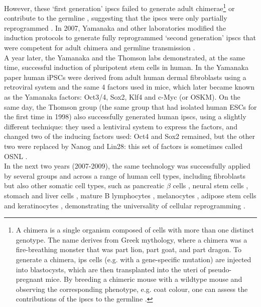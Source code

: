 However, these `first generation' \glspl{ipsc} failed to generate adult chimerae\footnote{A chimera is a single organism composed of cells with more than one distinct genotype.
The name derives from Greek mythology, where a chimera was a fire-breathing monster that was part lion, part goat, and part dragon. 
To generate a chimera, \gls{ips} cells (e.g. with a gene-specific mutation) are injected into blastocysts, which are then transplanted into the uteri of pseudo-pregnant mice.
By breeding a chimeric mouse with a wildtype mouse and observing the corresponding phenotype, e.g. coat colour, one can assess the contributions of the \glspl{ipsc} to the germline \cite{okita2007generation}.} or contribute to the germline \cite{takahashi2006induction}, suggesting that the \glspl{ipsc} were only partially reprogrammed \cite{omole2018ten}. 
In 2007, Yamanaka and other laboratories modified the induction protocols to generate fully reprogrammed `second generation' \glspl{ipsc} that were competent for adult chimera and germline transmission \cite{maherali2007directly, wernig2007vitro, okita2007generation}.\\

A year later, the Yamanaka and the Thomson labs demonstrated, at the same time, successful induction of pluripotent stem cells in human.
In the Yamanaka paper \cite{takahashi2007induction} human iPSCs were derived from adult human dermal fibroblasts using a retroviral system and the same 4 factors used in mice, which later became known as the Yamanaka factors: Oct3/4, Sox2, Klf4 and c-Myc (or OSKM).
On the same day, the Thomson group (the same group that had isolated human ESCs for the first time in 1998) also successfully generated human \glspl{ipsc}, using a slightly different technique: they used a lentiviral system to express the factors, and changed two of the inducing factors used: Oct4 and Sox2 remained, but the other two were replaced by Nanog and Lin28: this set of factors is sometimes called OSNL \cite{yu2007induced}.\\

In the next two years (2007-2009), the same technology was successfully applied by several groups and across a range of human cell types, including fibroblasts \cite{park2008reprogramming} but also other somatic cell types, such as pancreatic $\beta$ cells \cite{stadtfeld2008reprogramming}, neural stem cells \cite{eminli2008reprogramming, kim2008pluripotent}, stomach and liver cells \cite{aoi2008generation}, mature B lymphocytes \cite{hanna2008direct}, melanocytes \cite{utikal2009sox2}, adipose stem cells \cite{sun2009feeder} and keratinocytes \cite{maherali2008high}, demonstrating the universality of cellular reprogramming \cite{omole2018ten}.


